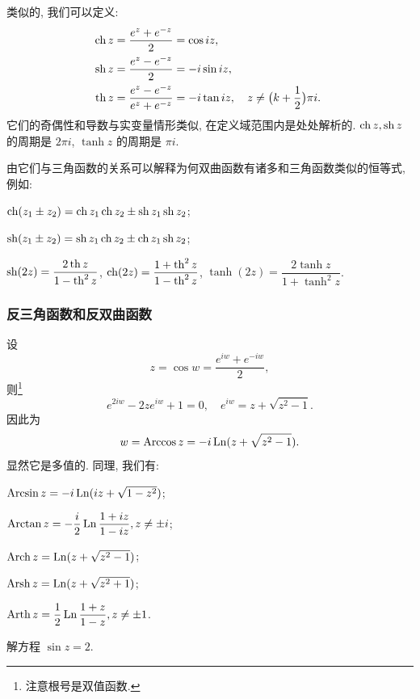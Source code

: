 类似的, 我们可以定义:
\begin{align*}
  \operatorname{ch} z&=\frac{e^z+e^{-z}}2=\cos iz,\\
  \operatorname{sh} z&=\frac{e^z-e^{-z}}2=-i\sin iz,\\
  \operatorname{th} z&=\frac{e^z-e^{-z}}{e^z+e^{-z}}
    =-i\tan iz,\quad z\neq \bigl(k+\frac{1}{2}\bigr)\pi i.\
\end{align*}
它们的奇偶性和导数与实变量情形类似, 在定义域范围内是处处解析的.
$\operatorname{ch} z,\operatorname{sh} z$ 的周期是 $2\pi i$, $\tanh z$ 的周期是 $\pi i$.

由它们与三角函数的关系可以解释为何双曲函数有诸多和三角函数类似的恒等式, 例如:

\begin{itempar}
  \item $\operatorname{ch}(z_1\pm z_2)=\operatorname{ch} z_1 \operatorname{ch} z_2\pm\operatorname{sh} z_1 \operatorname{sh} z_2$;
  \item $\operatorname{sh}(z_1\pm z_2)=\operatorname{sh} z_1 \operatorname{ch} z_2\pm\operatorname{ch} z_1 \operatorname{sh} z_2$;
  \item $\operatorname{sh}(2z)=\dfrac{2\operatorname{th} z}{1-\operatorname{th}^2 z}$, $\operatorname{ch}(2z)=\dfrac{1+\operatorname{th}^2 z}{1-\operatorname{th}^2 z}$, $\tanh(2z)=\dfrac{2\tanh z}{1+\tanh^2 z}$.
\end{itempar}

\subsubsection{反三角函数和反双曲函数}

设
\[
  z=\cos w=\dfrac{e^{iw}+e^{-iw}}2,\]
则\footnote{注意根号是双值函数.}
\[
  e^{2iw}-2ze^{iw}+1=0,\quad
  e^{iw}=z+\sqrt{z^2-1}.
\]
因此为
\[
  w=\operatorname{Arccos} z=-i\operatorname{Ln}(z+\sqrt{z^2-1}).
\]
显然它是多值的. 同理, 我们有:

\begin{itempar}
  \item {} $\operatorname{Arcsin} z=-i\operatorname{Ln}(iz+\sqrt{1-z^2})$;
  \item {} $\operatorname{Arctan} z=-\dfrac i2\operatorname{Ln}\dfrac{1+iz}{1-iz}, z\neq \pm i$;
  \item \noun{反双曲余弦函数} $\operatorname{Arch} z=\operatorname{Ln}(z+\sqrt{z^2-1})$;
  \item {} $\operatorname{Arsh} z=\operatorname{Ln}(z+\sqrt{z^2+1})$;
  \item {} $\operatorname{Arth} z=\dfrac12\operatorname{Ln}\dfrac{1+z}{1-z}, z\neq \pm1$.
\end{itempar}

\begin{example}
  解方程 $\sin z=2$.
\end{example}

